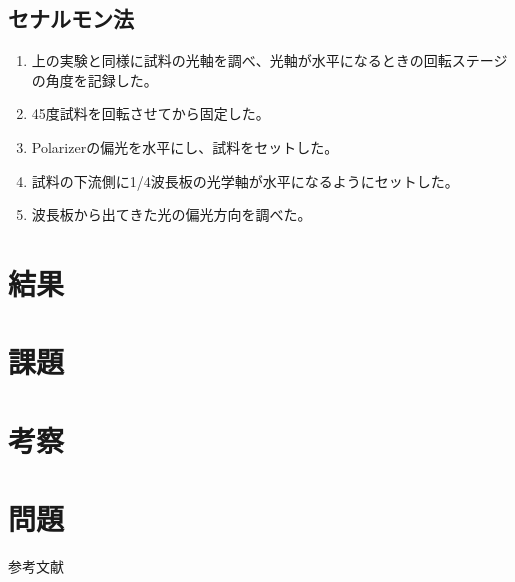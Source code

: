 \documentclass[a4paper,11pt]{jsarticle}
\begin{document}
\subsection{セナルモン法}
\begin{enumerate}
  \item 上の実験と同様に試料の光軸を調べ、光軸が水平になるときの回転ステージの角度を記録した。
  \item 45度試料を回転させてから固定した。
  \item Polarizerの偏光を水平にし、試料をセットした。
  \item 試料の下流側に1/4波長板の光学軸が水平になるようにセットした。
  \item 波長板から出てきた光の偏光方向を調べた。
\end{enumerate}

\section{結果}

\section{課題}

\section{考察}

\section{問題}

\begin{thebibliography}{99}
   参考文献
\end{thebibliography}
\end{document}
